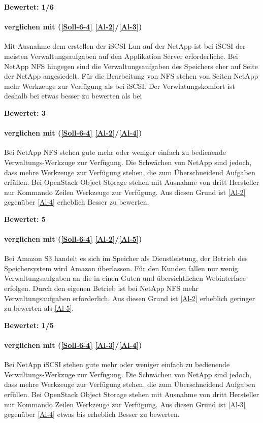\textbf{Bewertet: 1/6}

\paragraph*{  verglichen mit  (\ref{Soll-6-4} \ref{Al-2}/\ref{Al-3})}
Mit Ausnahme dem erstellen der iSCSI Lun auf der NetApp ist bei iSCSI der meisten Verwaltungsaufgaben auf den Applikation Server erforderliche. Bei NetApp NFS hingegen sind die Verwaltungsaufgaben des Speichers eher auf Seite der NetApp angesiedelt. Für die Bearbeitung von NFS stehen von Seiten NetApp mehr Werkzeuge zur Verfügung als bei iSCSI. Der Verwlatungskomfort ist deshalb bei  etwas besser zu bewerten als bei 

\textbf{Bewertet: 3}

\paragraph*{  verglichen mit  (\ref{Soll-6-4} \ref{Al-2}/\ref{Al-4})}
Bei NetApp NFS stehen gute mehr oder weniger einfach zu bedienende Verwaltungs-Werkzuge zur Verfügung. Die Schwächen von NetApp sind jedoch, dass mehre Werkzeuge zur Verfügung stehen, die zum Überschneidend Aufgaben erfüllen. Bei OpenStack Object Storage stehen mit Ausnahme von dritt Hersteller nur Kommando Zeilen Werkzeuge zur Verfügung. 
Aus diesen Grund ist  \ref{Al-2} gegenüber  \ref{Al-4} erheblich Besser zu bewerten.
 
\textbf{Bewertet: 5}

\paragraph*{  verglichen mit  (\ref{Soll-6-4} \ref{Al-2}/\ref{Al-5})}
Bei Amazon S3 handelt es sich im Speicher als Dienstleistung, der Betrieb des Speichersystem wird Amazon überlassen. Für den Kunden fallen nur wenig Verwaltungsaufgaben an die in einen Guten und übersichtlichen Webinterface erfolgen. Durch den eigenen Betrieb ist bei NetApp NFS mehr Verwaltungsaufgaben erforderlich. Aus diesen Grund ist  \ref{Al-2} erheblich geringer zu bewerten als  \ref{Al-5}.

\textbf{Bewertet: 1/5}


\paragraph*{  verglichen mit  (\ref{Soll-6-4} \ref{Al-3}/\ref{Al-4})}
Bei NetApp iSCSI stehen gute mehr oder weniger einfach zu bedienende Verwaltungs-Werkzuge zur Verfügung. Die Schwächen von NetApp sind jedoch, dass mehre Werkzeuge zur Verfügung stehen, die zum Überschneidend Aufgaben erfüllen. Bei OpenStack Object Storage stehen mit Ausnahme von dritt Hersteller nur Kommando Zeilen Werkzeuge zur Verfügung. 
Aus diesen Grund ist  \ref{Al-3} gegenüber  \ref{Al-4} etwas bis erheblich Besser zu bewerten.
 
